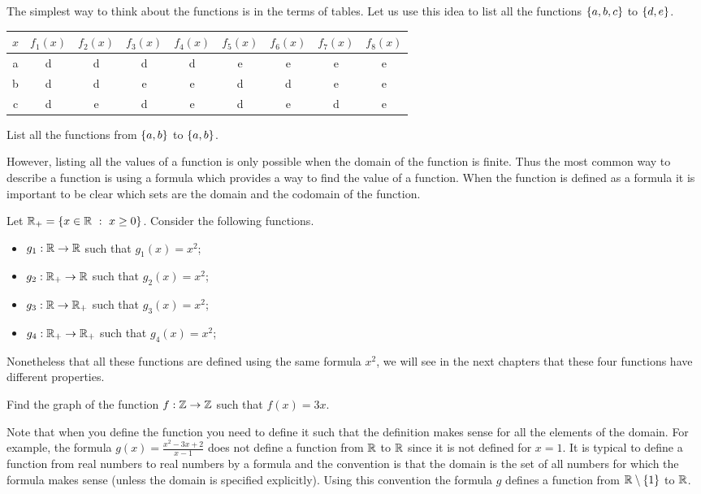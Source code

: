 The simplest way to think about the functions is in the terms of tables.
Let us use this idea to list all the functions $\set{a, b, c}$ to $\set{d, e}$.
\begin{center}
  \begin{tabular}{c | c | c | c | c | c | c | c | c}
    $x$ & $f_1(x)$ & $f_2(x)$ & $f_3(x)$ & $f_4(x)$ & $f_5(x)$ & $f_6(x)$ &
    $f_7(x)$ & $f_8(x)$ \\
    \hline
    a & d & d & d & d & e & e & e & e \\
    b & d & d & e & e & d & d & e & e \\
    c & d & e & d & e & d & e & d & e
  \end{tabular}
\end{center}

\begin{exercise}
  List all the functions from $\set{a, b}$ to $\set{a, b}$.
\end{exercise}

However, listing all the values of a function is only possible when the domain
of the function is finite. Thus the most common way to describe a function is
using a formula which provides a way to find the value of a function. When the
function is defined as a formula it is important to be clear which sets are the
domain and the codomain of the function.

Let $\R_+ = \set[x \ge 0]{x \in \R}$. Consider the following functions.
\begin{itemize}
  \item $g_1 : \mathbb{R} \to \mathbb{R}$ such that $g_1(x) = x^2$;
  \item $g_2 : \mathbb{R}_+ \to \mathbb{R}$ such that $g_2(x) = x^2$;
  \item $g_3 : \mathbb{R} \to \mathbb{R}_+$ such that $g_3(x) = x^2$;
  \item $g_4 : \mathbb{R}_+ \to \mathbb{R}_+$ such that $g_4(x) = x^2$;
\end{itemize}
Nonetheless that all these functions are defined using the same formula $x^2$,
we will see in the next chapters that these four functions have different
properties.

\begin{exercise}
  Find the graph of the function $f : \mathbb{Z} \to \mathbb{Z}$ such that $f(x) = 3x$.
\end{exercise}

Note that when you define the function you need to define it such that the
definition makes sense for all the elements of the domain. For example, the
formula $g(x) = \frac{x^2 - 3x + 2}{x - 1}$ does not define a function from
$\mathbb{R}$ to $\mathbb{R}$ since it is not defined for $x = 1$. It is typical to define a
function from real numbers to real numbers by a formula and the convention is
that the domain is the set of all numbers for which the formula makes sense
(unless the domain is specified explicitly).
Using this convention the formula $g$ defines a function from $\R \setminus
\set{1}$ to $\mathbb{R}$.

